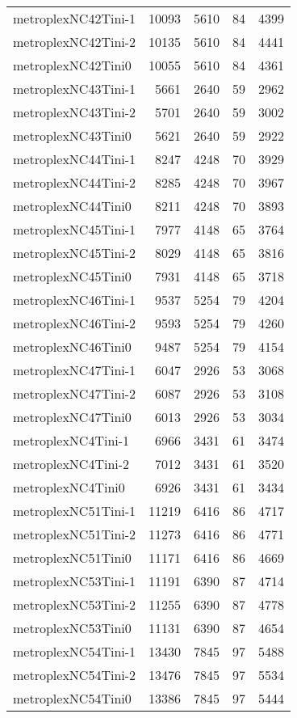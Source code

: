 \begin{longtable}{lrrrr}
metroplexNC42Tini-1 & 10093 & 5610 & 84 & 4399 \\
metroplexNC42Tini-2 & 10135 & 5610 & 84 & 4441 \\
metroplexNC42Tini0 & 10055 & 5610 & 84 & 4361 \\
metroplexNC43Tini-1 & 5661 & 2640 & 59 & 2962 \\
metroplexNC43Tini-2 & 5701 & 2640 & 59 & 3002 \\
metroplexNC43Tini0 & 5621 & 2640 & 59 & 2922 \\
metroplexNC44Tini-1 & 8247 & 4248 & 70 & 3929 \\
metroplexNC44Tini-2 & 8285 & 4248 & 70 & 3967 \\
metroplexNC44Tini0 & 8211 & 4248 & 70 & 3893 \\
metroplexNC45Tini-1 & 7977 & 4148 & 65 & 3764 \\
metroplexNC45Tini-2 & 8029 & 4148 & 65 & 3816 \\
metroplexNC45Tini0 & 7931 & 4148 & 65 & 3718 \\
metroplexNC46Tini-1 & 9537 & 5254 & 79 & 4204 \\
metroplexNC46Tini-2 & 9593 & 5254 & 79 & 4260 \\
metroplexNC46Tini0 & 9487 & 5254 & 79 & 4154 \\
metroplexNC47Tini-1 & 6047 & 2926 & 53 & 3068 \\
metroplexNC47Tini-2 & 6087 & 2926 & 53 & 3108 \\
metroplexNC47Tini0 & 6013 & 2926 & 53 & 3034 \\
metroplexNC4Tini-1 & 6966 & 3431 & 61 & 3474 \\
metroplexNC4Tini-2 & 7012 & 3431 & 61 & 3520 \\
metroplexNC4Tini0 & 6926 & 3431 & 61 & 3434 \\
metroplexNC51Tini-1 & 11219 & 6416 & 86 & 4717 \\
metroplexNC51Tini-2 & 11273 & 6416 & 86 & 4771 \\
metroplexNC51Tini0 & 11171 & 6416 & 86 & 4669 \\
metroplexNC53Tini-1 & 11191 & 6390 & 87 & 4714 \\
metroplexNC53Tini-2 & 11255 & 6390 & 87 & 4778 \\
metroplexNC53Tini0 & 11131 & 6390 & 87 & 4654 \\
metroplexNC54Tini-1 & 13430 & 7845 & 97 & 5488 \\
metroplexNC54Tini-2 & 13476 & 7845 & 97 & 5534 \\
metroplexNC54Tini0 & 13386 & 7845 & 97 & 5444 \\

\end{longtable}
